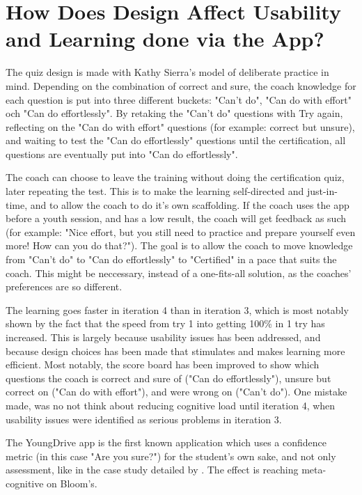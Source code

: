 
\section{How Does Design Affect Usability and Learning done via the App?}

  The quiz design is made with Kathy Sierra's model of deliberate practice in mind. \cite{sierra} Depending on the combination of correct and sure, the coach knowledge for each question is put into three different buckets: "Can't do", "Can do with effort" och "Can do effortlessly". By retaking the "Can't do" questions with Try again, reflecting on the "Can do with effort" questions (for example: correct but unsure), and waiting to test the "Can do effortlessly" questions until the certification, all questions are eventually put into "Can do effortlessly".

  The coach can choose to leave the training without doing the certification quiz, later repeating the test. This is to make the learning self-directed and just-in-time, and to allow the coach to do it's own scaffolding. If the coach uses the app before a youth session, and has a low result, the coach will get feedback as such (for example: "Nice effort, but you still need to practice and prepare yourself even more! How can you do that?"). The goal is to allow the coach to move knowledge from "Can't do" to "Can do effortlessly" to "Certified" in a pace that suits the coach. This might be neccessary, instead of a one-fits-all solution, as the coaches' preferences are so different.

  The learning goes faster in iteration 4 than in iteration 3, which is most notably shown by the fact that the speed from try 1 into getting 100\% in 1 try has increased. This is largely because usability issues has been addressed, and because design choices has been made that stimulates and makes learning more efficient. Most notably, the score board has been improved to show which questions the coach is correct and sure of ("Can do effortlessly"), unsure but correct on ("Can do with effort"), and were wrong on ("Can't do"). One mistake made, was no not think about reducing cognitive load \cite{sierra} until iteration 4, when usability issues were identified as serious problems in iteration 3.

  The YoungDrive app is the first known application which uses a confidence metric (in this case "Are you sure?") for the student's own sake, and not only assessment, like in the case study detailed by \cite{nicol}. The effect is reaching meta-cognitive on Bloom's.


